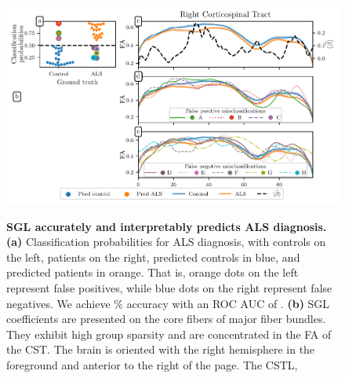 \documentclass[10pt,%
               aps,%
               prl,%
               reprint,%
               superscriptaddress,%
               preprintnumbers,%
               linenumbers,%
               amsmath,%
               floatfix]{revtex4-1}
\begin{document}
\begin{figure}
    \vspace{4.0cm}
    \vspace{-9.25cm}
    \includegraphics[width=\textwidth]{als_results.pdf}
    {\label{fig:class-results:probs}}
    {\label{fig:class-results:coefs3d}}
    {\label{fig:class-results:tract-profiles}}
    {\label{fig:class-results:false-positives}}
    {\label{fig:class-results:false-negatives}}
    \caption{%
        {\bf SGL accurately and interpretably predicts ALS diagnosis.}
        \label{fig:class-results}
        {\bf (a)} Classification probabilities for ALS diagnosis, with
        controls on the left, patients on the right, predicted controls in
        blue, and predicted patients in orange. That is, orange dots on the left
        represent false positives, while blue dots on the right represent
        false negatives. We achieve {\protect\alsAccuracy}\% accuracy with an
        ROC AUC of {\protect\alsRocAuc}.
        {\bf (b)} SGL coefficients are presented on the core fibers of major
        fiber bundles. They exhibit high group sparsity and are concentrated
        in the FA of the CST. The brain is oriented with the right hemisphere
        in the foreground and anterior to the right of the page. The CSTL,
}
\end{figure}
\end{document}
